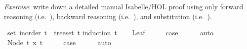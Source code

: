 \begin{isabellebody}
\begin{isamarkuptext}
      \emph{Exercise}: write down a detailed manual Isabelle/HOL proof using only forward reasoning
                (i.e.\ ), backward reasoning (i.e.\ ), and
                substitution (i.e.\ ).%
\end{isamarkuptext}\isamarkuptrue%
\isamarkupfalse%
\ {\isachardoublequoteopen}set\ {\isacharparenleft}{\kern0pt}inorder\ t{\isacharparenright}{\kern0pt}\ {\isacharequal}{\kern0pt}\ tree{\isacharunderscore}{\kern0pt}set\ t{\isachardoublequoteclose}\isanewline
%
\isadelimproof
%
\endisadelimproof
%
\isatagproof
{}\isamarkupfalse%
{\isacharparenleft}{\kern0pt}induction\ t{\isacharparenright}{\kern0pt}\isanewline
\ \ \isamarkupfalse%
\ Leaf\isanewline
\ \ \isamarkupfalse%
\ \isamarkupfalse%
\ {\isacharquery}{\kern0pt}case\isanewline
\ \ \ \ \isamarkupfalse%
\ auto\isanewline
{}\isamarkupfalse%
\isanewline
\ \ \isamarkupfalse%
\ {\isacharparenleft}{\kern0pt}Node\ t{}\ x{}\ t{}{\isacharparenright}{\kern0pt}\isanewline
\ \ \isamarkupfalse%
\ \isamarkupfalse%
\ {\isacharquery}{\kern0pt}case\isanewline
\ \ \ \ \isamarkupfalse%
\ auto\isanewline
{}\isamarkupfalse%
%
\endisatagproof
{\isafoldproof}%
%
\isadelimproof
\isanewline
%
\endisadelimproof
\isanewline
\isanewline
\isanewline
%
\isadelimtheory
\isanewline
%
\endisadelimtheory
%
\isatagtheory
{}\isamarkupfalse%
%
\endisatagtheory
{\isafoldtheory}%
%
\isadelimtheory
%
\endisadelimtheory
%
\end{isabellebody}%
\endinput
